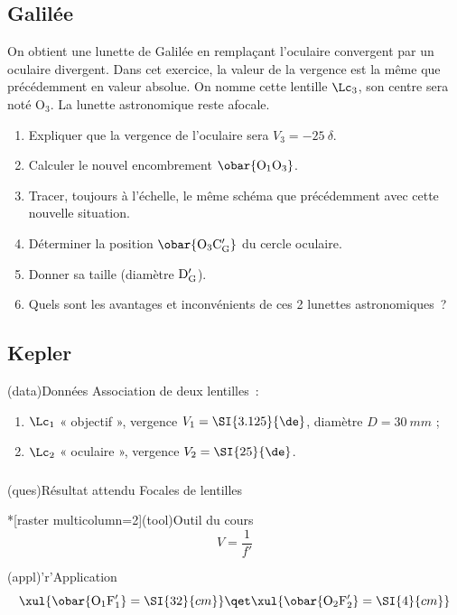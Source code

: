 \documentclass[../../main/main.tex]{subfiles}
\begin{document}
{	\subsection{Galilée}

	On obtient une lunette de Galilée en remplaçant l'oculaire convergent par un
	oculaire divergent. Dans cet exercice, la valeur de la vergence est la même
	que précédemment en valeur absolue. On nomme cette lentille $\Lc_3$, son
	centre sera noté O$_3$. La lunette astronomique reste afocale.

	\begin{enumerate}
		\item Expliquer que la vergence de l'oculaire sera $V_3 = \SI{-25}{\delta}$.
		\item Calculer le nouvel encombrement $\obar{\rm O_1O_3}$.
		\item Tracer, toujours à l'échelle, le même schéma que précédemment avec
		      cette nouvelle situation.
		\item Déterminer la position $\obar{\rm O_3C'_G}$ du cercle oculaire.
		\item Donner sa taille (diamètre $\rm D'_G$).
		\item Quels sont les avantages et inconvénients de ces 2 lunettes
		      astronomiques~?
	\end{enumerate}
}{
	\subsection{Kepler}

	\begin{center}
		\begin{tcb}(data){Données}
			Association de deux lentilles~:
			\begin{enumerate}
				\item $\Lc_1$ « objectif », vergence $V_1 = \SI{3.125}{\de}$, diamètre $D
					      = \SI{30}{mm}$ ;
				\item $\Lc_2$ « oculaire », vergence $V_2 = \SI{25}{\de}$.
			\end{enumerate}
		\end{tcb}
	\end{center}

	\subsubsection{}

	\begin{tcbraster}[raster columns=7, raster equal height=rows]
		\begin{tcb}[raster multicolumn=2](ques){Résultat attendu}
			Focales de lentilles
		\end{tcb}
		\begin{tcb}*[raster multicolumn=2](tool){Outil du cours}
			\[
				V = \dfrac{1}{f'}
			\]
		\end{tcb}
		\begin{tcb}[raster multicolumn=3, valign=top](appl)'r'{Application}
			\[
				\xul{\obar{\rm O_1F'_1} = \SI{32}{cm}}
				\qet
				\xul{\obar{\rm O_2F'_2} = \SI{4}{cm}}
			\]
		\end{tcb}
	\end{tcbraster}

}
\end{document}
